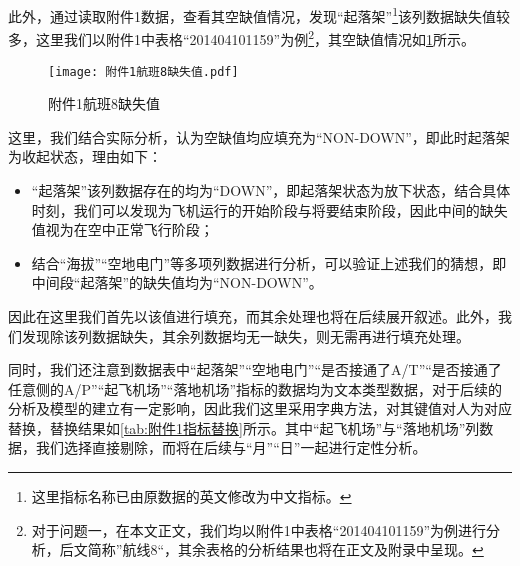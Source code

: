\documentclass{MathorCupModeling}
\begin{document}
	此外，通过读取附件1数据，查看其空缺值情况，发现“起落架”\textcolor{blue}{\footnote{这里指标名称已由原数据的英文修改为中文指标。}}该列数据缺失值较多，这里我们以附件1中表格“201404101159”为例\textcolor{blue}{\footnote{对于问题一，在本文正文，我们均以附件1中表格“201404101159”为例进行分析，后文简称”航线8“，其余表格的分析结果也将在正文及附录中呈现。}}，其空缺值情况如\textcolor{blue}{\cref{fig:附件1航班8缺失值}}所示。
	\begin{figure}[H]
		\centering
		\texttt{[image: 附件1航班8缺失值.pdf]}
		\caption{附件1航班8缺失值}
		\label{fig:附件1航班8缺失值}
	\end{figure}
	
	这里，我们结合实际分析，认为空缺值均应填充为“NON-DOWN”，即此时起落架为收起状态，理由如下：
	\begin{itemize}
		\item “起落架”该列数据存在的均为“DOWN”，即起落架状态为放下状态，结合具体时刻，我们可以发现为飞机运行的开始阶段与将要结束阶段，因此中间的缺失值视为在空中正常飞行阶段；
		\item 结合“海拔”“空地电门”等多项列数据进行分析，可以验证上述我们的猜想，即中间段“起落架”的缺失值均为“NON-DOWN”。
	\end{itemize}

	因此在这里我们首先以该值进行填充，而其余处理也将在后续展开叙述。此外，我们发现除该列数据缺失，其余列数据均无一缺失，则无需再进行填充处理。

	同时，我们还注意到数据表中“起落架”“空地电门”“是否接通了A/T”“是否接通了任意侧的A/P”“起飞机场”“落地机场”指标的数据均为文本类型数据，对于后续的分析及模型的建立有一定影响，因此我们这里采用字典方法，对其键值对人为对应替换，替换结果如\textcolor{blue}{\cref{tab:附件1指标替换}}所示。其中“起飞机场”与“落地机场”列数据，我们选择直接剔除，而将在后续与“月”“日”一起进行定性分析。
\begin{table}[H]
	\centering
	\caption{附件1指标替换}
	\label{tab:附件1指标替换}
\end{table}
\end{document}
